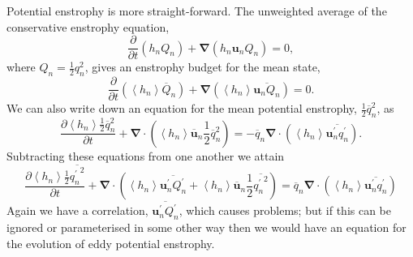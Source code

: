 \documentclass[12pt,a4paper]{report}
\newcommand*\thkmean[1]{\overline{#1}}
\newcommand*\thkres[1]{{#1}^{\prime}}
\newcommand*\nthkmean[1]{\left\langle{#1}\right\rangle}
\newcommand*{\half}{\frac{1}{2}}
\newcommand*{\partialdiff}[2][{}]{\frac{\partial #1}{\partial #2}}
\begin{document}
              Potential enstrophy is more straight-forward. The unweighted average of the
              conservative enstrophy equation,
              \begin{equation*}
              \partialdiff{t}\left(h_{n}Q_{n}\right)+\boldsymbol{\nabla}\left(h_{n}\boldsymbol{u}_{n}Q_{n}\right) = 0,
              \end{equation*}
              where $Q_{n} = \half q_{n}^{2}$, gives an
              enstrophy budget for the mean state,  
              \begin{equation*}
              \partialdiff{t}\left(\nthkmean{h_{n}}\thkmean{Q}_{n}\right)+\boldsymbol{\nabla}\left(\nthkmean{h_{n}}\thkmean{\boldsymbol{u}_{n}Q_{n}}\right) = 0.
              \end{equation*}
              We can also write down an equation for the mean potential enstrophy,
              $\half \thkmean{q}_{n}^{2}$, as
              \begin{equation*}
               \partialdiff[\nthkmean{h_{n}} \half \thkmean{q}_{n}^{2}]{t}+   \boldsymbol{\nabla}\cdot \left(\nthkmean{h_{n}} \thkmean{\boldsymbol{u}}_{n} \half \thkmean{q}_{n}^{2}\right) =-\thkmean{q}_{n} \boldsymbol{\nabla}\cdot\left( \nthkmean{h_{n}} \thkmean{\thkres{\boldsymbol{u}}_{n}\thkres{q}_{n}} \right).
              \end{equation*}
              Subtracting these equations from one another  we attain
              \begin{equation}
              \partialdiff[\nthkmean{h_{n}} \half \thkmean{{\thkres{q}_{n}}^{2}}]{t}+   \boldsymbol{\nabla}\cdot \left(\nthkmean{h_{n}} \thkmean{\thkres{\boldsymbol{u}}_{n} \thkres{Q}_{n}}+\nthkmean{h_{n}} \thkmean{\boldsymbol{u}}_{n} \half \thkmean{{\thkres{q}_{n}}^{2}}\right) =\thkmean{q}_{n} \boldsymbol{\nabla}\cdot\left( \nthkmean{h_{n}} \thkmean{\thkres{\boldsymbol{u}}_{n}\thkres{q}_{n}} \right)
              \label{eddyenstrophy}
              \end{equation}
              Again we have a correlation, $\thkmean{\thkres{\boldsymbol{u}}_{n} \thkres{Q}_{n}}$, which causes problems; but if this
              can be ignored or parameterised in some other way then we
              would have an equation for the evolution
              of eddy potential enstrophy.
              
\end{document}
